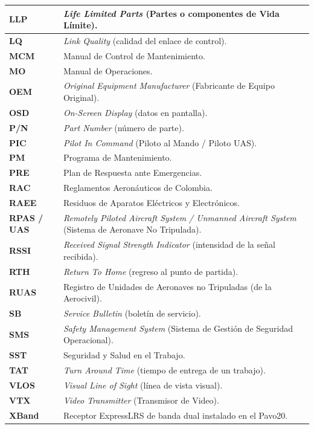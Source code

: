 \begin{longtable}{|p{}|p{}|}
\textbf{LLP} & \textit{Life Limited Parts} (Partes o componentes de Vida Límite). \\ \hline
\textbf{LQ} & \textit{Link Quality} (calidad del enlace de control). \\ \hline
\textbf{MCM} & Manual de Control de Mantenimiento. \\ \hline
\textbf{MO} & Manual de Operaciones. \\ \hline
\textbf{OEM} & \textit{Original Equipment Manufacturer} (Fabricante de Equipo Original). \\ \hline
\textbf{OSD} & \textit{On-Screen Display} (datos en pantalla). \\ \hline
\textbf{P/N} & \textit{Part Number} (número de parte). \\ \hline
\textbf{PIC} & \textit{Pilot In Command} (Piloto al Mando / Piloto UAS). \\ \hline
\textbf{PM} & Programa de Mantenimiento. \\ \hline
\textbf{PRE} & Plan de Respuesta ante Emergencias. \\ \hline
\textbf{RAC} & Reglamentos Aeronáuticos de Colombia. \\ \hline
\textbf{RAEE} & Residuos de Aparatos Eléctricos y Electrónicos. \\ \hline
\textbf{RPAS / UAS} & \textit{Remotely Piloted Aircraft System / Unmanned Aircraft System} (Sistema de Aeronave No Tripulada). \\ \hline
\textbf{RSSI} & \textit{Received Signal Strength Indicator} (intensidad de la señal recibida). \\ \hline
\textbf{RTH} & \textit{Return To Home} (regreso al punto de partida). \\ \hline
\textbf{RUAS} & Registro de Unidades de Aeronaves no Tripuladas (de la Aerocivil). \\ \hline
\textbf{SB} & \textit{Service Bulletin} (boletín de servicio). \\ \hline
\textbf{SMS} & \textit{Safety Management System} (Sistema de Gestión de Seguridad Operacional). \\ \hline
\textbf{SST} & Seguridad y Salud en el Trabajo. \\ \hline
\textbf{TAT} & \textit{Turn Around Time} (tiempo de entrega de un trabajo). \\ \hline
\textbf{VLOS} & \textit{Visual Line of Sight} (línea de vista visual). \\ \hline
\textbf{VTX} & \textit{Video Transmitter} (Transmisor de Video). \\ \hline
\textbf{XBand} & Receptor ExpressLRS de banda dual instalado en el Pavo20. \\ \hline
\end{longtable}


